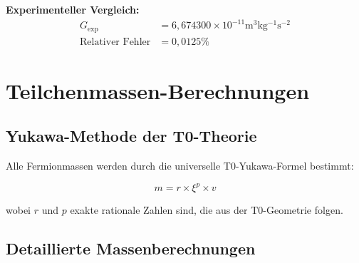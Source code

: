 \documentclass[11pt,a4paper]{article}
\begin{document}
\textbf{Experimenteller Vergleich:}
\begin{align}
	G_{\text{exp}} &= 6{,}674300 \times 10^{-11} \si{\meter^3 \kilogram^{-1} \second^{-2}} \\
	\text{Relativer Fehler} &= 0{,}0125\%
\end{align}

	
	\section{Teilchenmassen-Berechnungen}
	
	\subsection{Yukawa-Methode der T0-Theorie}
	
	Alle Fermionmassen werden durch die universelle T0-Yukawa-Formel bestimmt:
	
	\begin{equation}
		\boxed{m = r \times \xi^p \times v}
	\end{equation}
	
	wobei $r$ und $p$ exakte rationale Zahlen sind, die aus der T0-Geometrie folgen.
	
	\subsection{Detaillierte Massenberechnungen}
	
\end{document}
